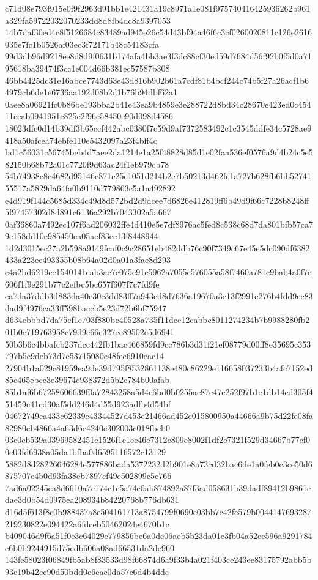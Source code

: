 \documentclass[11pt,a4paper]{article}
\begin{document}
{c71d08e793f915e0f9f2963d91bb1e421431a19c8971a1e081f975740416425936262b961a329fa59722032070233dd8d8fb4dc8a9397053
14b7daf30ed4c8f5126684c83489ad945e26c54d43bf94a46f6c3cf0260020811c126e2616035e7fc1b0526af03ec3f72171b48c54183cfa
99d3db96d9218ee8d8d9f0631b174afa4bb3ae3f3dc88cf30ed59d7684d56f92b0f5d0a7195618ba39474f3cc1e004d66b381ec57587b308
46bb4425dc31e16abce7743d63e43d816b902b61a7cdf81b4bcf244c74b5f27a26acf1b64979cb6de1e6736aa192d08b2d1b76b94dbf62a1
0aee8a06921fc0b86be193bba2b41e43ea9b4859e3e288722d8bd34c28670e423ed0c45411ccab0941951c825c2f96e58450e90d098d4586
18023dfc0d14b39df3b65ccf442abc0380f7c59d9af7372583492c1c3545ddfe34c5728ae9418a50afcea74ebfe110e5432097a23f4bff4c
bd1c56031c56745beb4d7aee2da1214e1a25f48828d85d1e02faa536ef0576a9d4b24c5e582150b68b72a01c7720f9d63ac24f1eb979cb78
54b74938c8c4682d95146c871e25e1051d214b2e7b50213d462fe1a727b628fb6bb5274155517a5829da64fa0b9110d779863c5a1a492892
e4d919f144c5685d334c49d8d572bd2d9dcee7d6826e412819ff6b49d9f66c7228b8248ff5f97457302d8d891c6136a292b7043302a5a667
0af36860a7492ec107f6ad206032ffe4d410e5e7df8976ac5fed8c538c68d7da801bfb57ca79c158dd10e985450ea05acf83ec13f8448944
1d2d3015ec27a2b598a9149fcaf0c9c28651eb482ddb76c90f7349c67e45e5dc090df6382433a223ee493355b08b64a02d0a01a3fae8d293
e4a2bd6219ce1540141eab3ac7c075e91c5962a7055e576055a58f7460a781c9bab4a0f7e606f1f9e291b77c2efbc5bc657f607f7c7fd9fe
ea7da37ddb3d883da40c30c3dd83ff7a943cd8d7636a19670a3e13f2991e276b4fdd9ec83dad9f4976ca33ff598baccb5e23d72b6bf75947
d634ebbbd7da75cf1e703f880bc40528a735f11dcc12cabbc8011274234b7b9988280fb201b0e719763958c79d9c66e327ec89502e5d6941
50b3b6c4bbafcb237dcc442fb1bac466859fd9cc786b3d31f21ef08779d00ff8e35695c353797b5e9deb73d7e53715080e48fee6910eac14
27904b1a029c81959ea9de39d795f8532861138e480c86229e116658037233b4afc7152ed85c465ebcc3e39674c938372d5b2c784b00afab
85b1af6b67258606639f0a72843258a5d4e6bd0b0255ac87e47c252f97b1e1db14ed305f451459c41cd30af5dd246d4d55d923adfb4d54bf
04672749ca433c62339e43344527d453e21466ad452c015800950a44666a9b75d22fe08fa82980eb4866a4a63d6e4240e302003c018fbeb0
03c0cb539a03969582451c1526f1c1ec46e7312c809e8002f1df2e7321f529d34667b77ef00c03fd6938a05da1bfba0d6595116572e13129
5882d8d28226646284e577886bada5372232d2b901e8a73cd32bac6de1a0feb0c3ce50d6875707c4b0d93fa38eb7897cf49e502899c5c766
7ad6a02245ea8d6610a7c174c1c5a74e0ab874892a87f3ad058631b39dadf89412b9861edae3d0b54d0975ea208934b84220768b776db631
d16d5f613f8c0b988437a8e504161713a8754799f0690e03bb7c42fc579b0044147693287219230822e094422a6fdceb50462024e4670b1c
b409046d9f6a51f0e3c64029e779856be6a0de06aeb5b23da01c3fb04a52ec596a9291784e6b0b9244915d75edb606a08ad66531da2de960
143fe58023f06849fb5ab8f83533d98f66874d6a9f33b4a021f403ce243ee83175792abb5b93e19b42cc90d50bdd0c6eac0da57c6d4b4dde
}
\end{document}
